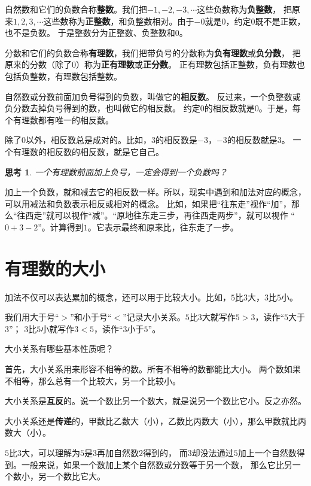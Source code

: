 \documentclass[12pt,UTF8]{ctexbook}
\theoremstyle{definition}
\theoremstyle{plain}
\newtheorem{sk}{思考}[section]
\begin{document}
自然数和它们的负数合称\textbf{整数}。我们把$-1, -2, -3, \cdots$这些负数称为\textbf{负整数}，
把原来$1,2,3,\cdots$这些数称为\textbf{正整数}，和负整数相对。由于$-0$就是$0$，约定$0$既不是正数，也不是负数。
于是整数分为正整数、负整数和$0$。

分数和它们的负数合称\textbf{有理数}，我们把带负号的分数称为\textbf{负有理数}或\textbf{负分数}，
把原来的分数（除了$0$）称为\textbf{正有理数}或\textbf{正分数}。
正有理数包括正整数，负有理数也包括负整数，有理数包括整数。

自然数或分数前面加负号得到的负数，叫做它的\textbf{相反数}。
反过来，一个负整数或负分数去掉负号得到的数，也叫做它的相反数。
约定$0$的相反数就是$0$。于是，每个有理数都有唯一的相反数。

除了$0$以外，相反数总是成对的。比如，$3$的相反数是$-3$，$-3$的相反数就是$3$。
一个有理数的相反数的相反数，就是它自己。

\begin{sk}\label{sk:0-0-0}
    一个有理数前面加上负号，一定会得到一个负数吗？
\end{sk}

加上一个负数，就和减去它的相反数一样。所以，现实中遇到和加法对应的概念，可以用减法和负数表示相反或相对的概念。
比如，如果把“往东走”视作“加”，那么“往西走”就可以视作“减”。“原地往东走三步，再往西走两步”，就可以视作
“$0+3-2$”。计算得到$1$。它表示最终和原来比，往东走了一步。

\section{有理数的大小}
加法不仅可以表达累加的概念，还可以用于比较大小。比如，$5$比$3$大，$3$比$5$小。

我们用大于号“$>$”和小于号“$<$”记录大小关系。$5$比$3$大就写作$5>3$，读作“$5$大于$3$”；
$3$比$5$小就写作$3<5$，读作“$3$小于$5$”。

大小关系有哪些基本性质呢？

首先，大小关系用来形容不相等的数。所有不相等的数都能比大小。
两个数如果不相等，那么总有一个比较大，另一个比较小。

大小关系是\textbf{互反}的。说一个数比另一个数大，就是说另一个数比它小。反之亦然。

大小关系还是\textbf{传递}的，甲数比乙数大（小），乙数比丙数大（小），那么甲数就比丙数大（小）。

$5$比$3$大，可以理解为$5$是$3$再加自然数$2$得到的，
而$3$却没法通过$5$加上一个自然数得到。一般来说，如果一个数加上某个自然数或分数等于另一个数，
那么它比另一个数小，另一个数比它大。
\end{document}
